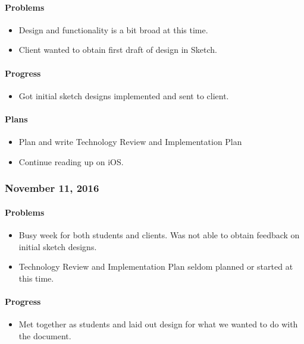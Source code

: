 \paragraph{Problems}\label{problems}
\begin{itemize}
\tightlist
\item
  Design and functionality is a bit broad at this time.
\item
  Client wanted to obtain first draft of design in Sketch.
\end{itemize}
\paragraph{Progress}\label{progress}
\begin{itemize}
\tightlist
\item
  Got initial sketch designs implemented and sent to client.
\end{itemize}
\paragraph{Plans}\label{plans}
\begin{itemize}
\tightlist
\item
  Plan and write Technology Review and Implementation Plan
\item
  Continue reading up on iOS.
\end{itemize}

\subsubsection{November 11, 2016}\label{section}
\paragraph{Problems}\label{problems}
\begin{itemize}
\tightlist
\item
  Busy week for both students and clients. Was not able to obtain
  feedback on initial sketch designs.
\item
  Technology Review and Implementation Plan seldom planned or started at
  this time.
\end{itemize}
\paragraph{Progress}\label{progress}
\begin{itemize}
\tightlist
\item
  Met together as students and laid out design for what we wanted to do
  with the document.
\end{itemize}
